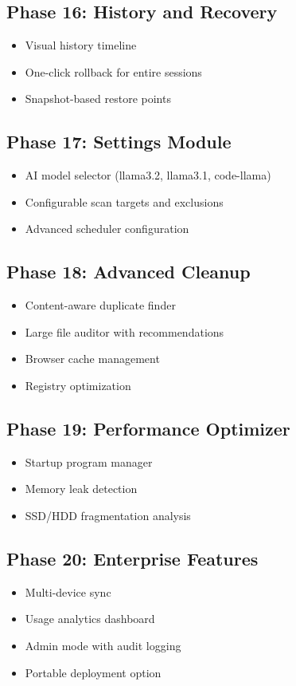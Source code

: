 \documentclass[11pt,a4paper]{article}
\begin{document}
\subsection{Phase 16: History and Recovery}
\begin{itemize}
    \item Visual history timeline
    \item One-click rollback for entire sessions
    \item Snapshot-based restore points
\end{itemize}

\subsection{Phase 17: Settings Module}
\begin{itemize}
    \item AI model selector (llama3.2, llama3.1, code-llama)
    \item Configurable scan targets and exclusions
    \item Advanced scheduler configuration
\end{itemize}

\subsection{Phase 18: Advanced Cleanup}
\begin{itemize}
    \item Content-aware duplicate finder
    \item Large file auditor with recommendations
    \item Browser cache management
    \item Registry optimization
\end{itemize}

\subsection{Phase 19: Performance Optimizer}
\begin{itemize}
    \item Startup program manager
    \item Memory leak detection
    \item SSD/HDD fragmentation analysis
\end{itemize}

\subsection{Phase 20: Enterprise Features}
\begin{itemize}
    \item Multi-device sync
    \item Usage analytics dashboard
    \item Admin mode with audit logging
    \item Portable deployment option
\end{itemize}
\end{document}
